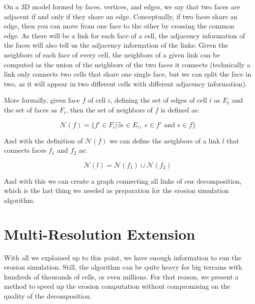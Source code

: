 On a 3D model formed by faces, vertices, and edges, we say that two 
faces are adjacent if and only if they share an edge. Conceptually, 
if two faces share an edge, then you can move from one face to the other 
by crossing the common edge. As there will be a link for 
each face of a cell, the adjacency information of the faces will also 
tell us the adjacency information of the links: Given the neighbors 
of each face of every cell, the neighbors of a given link can be computed 
as the union of the neighbors of the two faces it connects (technically 
a link only connects two cells that share one single face, but we can 
split the face in two, as it will appear in two different 
cells with different adjacency information). 

\vspace{10pt}

More formally, given face $f$ of cell $i$, defining the 
set of edges of cell $i$ as $E_i$ and the set of faces as $F_i$, 
then the set of neighbors of $f$ is defined as:

\begin{equation}
    \mathcal{N}(f) = \{f' \in F_i | \exists e \in E_i, \; e \in  f' \text{ and } e \in f\}
\end{equation}

And with the definition of $\mathcal{N}(f)$ we can define the neighbors 
of a link $l$ that connects faces $f_1$ and $f_2$ as:

\begin{equation}
    \mathcal{N}(l) = \mathcal{N}(f_1) \cup \mathcal{N}(f_2) 
\end{equation}

And with this we can create a graph connecting all links of our decomposition, 
which is the last thing we needed as preparation for the erosion simulation 
algorithm.

\section{Multi-Resolution Extension} \label{sec:multiResolution}

With all we explained up to this point, we have enough information to 
run the erosion simulation. Still, the algorithm can be quite heavy 
for big terrains with hundreds of thousands of cells, or even 
millions. For that reason, we present a method to speed up the erosion 
computation without compromising on the quality of the decomposition.

\vspace{10pt}

